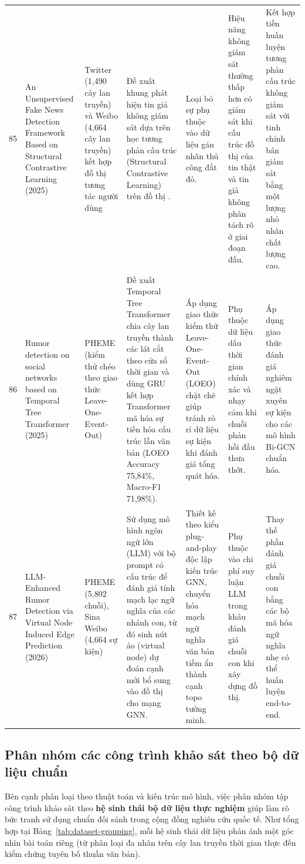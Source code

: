 \documentclass[11pt,a4paper]{extreport}
\begin{document}
\begin{landscape}
\begin{longtable}{@{}C{0.6cm}p{3.6cm}p{2.7cm}p{4.8cm}p{3.6cm}p{3.6cm}p{3.6cm}@{}}
85 & An Unsupervised Fake News Detection Framework Based on Structural Contrastive Learning (2025) \cite{noauthor_unsupervised_2025} & Twitter (1,490 cây lan truyền) và Weibo (4,664 cây lan truyền) kết hợp đồ thị tương tác người dùng & Đề xuất khung phát hiện tin giả không giám sát dựa trên học tương phản cấu trúc (Structural Contrastive Learning) trên đồ thị \cite{noauthor_unsupervised_2025}. & Loại bỏ sự phụ thuộc vào dữ liệu gán nhãn thủ công đắt đỏ. & Hiệu năng không giám sát thường thấp hơn có giám sát khi cấu trúc đồ thị của tin thật và tin giả không phân tách rõ ở giai đoạn đầu. & Kết hợp tiền huấn luyện tương phản cấu trúc không giám sát với tinh chỉnh bán giám sát bằng một lượng nhỏ nhãn chất lượng cao. \\ 

86 & Rumor detection on social networks based on Temporal Tree Transformer (2025) \cite{wu_rumor_2025} & PHEME (kiểm thử chéo theo giao thức Leave-One-Event-Out) & Đề xuất Temporal Tree Transformer chia cây lan truyền thành các lát cắt theo cửa sổ thời gian và dùng GRU kết hợp Transformer mã hóa sự tiến hóa cấu trúc lẫn văn bản (LOEO Accuracy 75,84\%, Macro-F1 71,98\%). & Áp dụng giao thức kiểm thử Leave-One-Event-Out (LOEO) chặt chẽ giúp tránh rò rỉ dữ liệu sự kiện khi đánh giá tổng quát hóa. & Phụ thuộc dữ liệu dấu thời gian chính xác và nhạy cảm khi chuỗi phản hồi đầu thưa thớt. & Áp dụng giao thức đánh giá nghiêm ngặt xuyên sự kiện cho các mô hình Bi-GCN chuẩn hóa. \\ 

87 & LLM-Enhanced Rumor Detection via Virtual Node Induced Edge Prediction (2026) \cite{tao_llm-enhanced_2026} & PHEME (5,802 chuỗi), Sina Weibo (4,664 sự kiện) & Sử dụng mô hình ngôn ngữ lớn (LLM) với bộ prompt có cấu trúc để đánh giá tính mạch lạc ngữ nghĩa của các nhánh con, từ đó sinh nút ảo (virtual node) dự đoán cạnh mới bổ sung vào đồ thị cho mạng GNN. & Thiết kế theo kiểu plug-and-play độc lập kiến trúc GNN, chuyển hóa mạch ngữ nghĩa văn bản tiềm ẩn thành cạnh topo tường minh. & Phụ thuộc vào chi phí suy luận LLM trong khâu đánh giá chuỗi con khi xây dựng đồ thị. & Thay thế phần đánh giá chuỗi con bằng các bộ mã hóa ngữ nghĩa nhẹ có thể huấn luyện end-to-end. \\ 
\end{longtable}


\setlength{\tabcolsep}{6pt}
\end{landscape}
\clearpage

\subsection{Phân nhóm các công trình khảo sát theo bộ dữ liệu chuẩn}
Bên cạnh phân loại theo thuật toán và kiến trúc mô hình, việc phân nhóm tập công trình khảo sát theo \textbf{hệ sinh thái bộ dữ liệu thực nghiệm} giúp làm rõ bức tranh sử dụng chuẩn đối sánh trong cộng đồng nghiên cứu quốc tế. Như tổng hợp tại Bảng~\ref{tab:dataset-grouping}, mỗi hệ sinh thái dữ liệu phản ánh một góc nhìn bài toán riêng (từ phân loại đa nhãn trên cây lan truyền thời gian thực đến kiểm chứng tuyên bố thuần văn bản).
\end{document}
